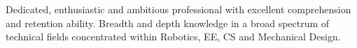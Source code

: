 \documentclass[10pt,a4paper,ragged2e,withhyper]{altacv}
\begin{document}

\makecvheader
Dedicated, enthusiastic and ambitious professional with excellent comprehension and retention ability. Breadth and depth knowledge in a broad spectrum of technical fields concentrated within Robotics, EE, CS and Mechanical Design.

\end{document}
